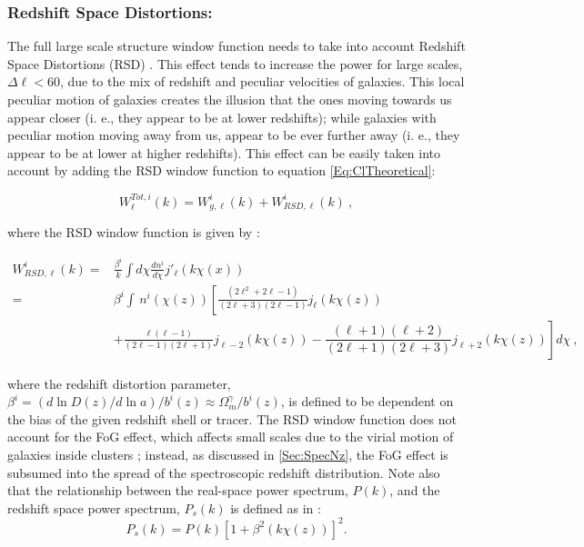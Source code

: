 \subsubsection{Redshift Space Distortions:}\label{Sec:RSD}
The full large scale structure window function needs to take into account Redshift Space Distortions (RSD) \citep{1987Kaiser-RSD,Blake2007,Padm2007,Thomas2011}. This effect tends to increase the power for large scales, $\Delta \ell < 60$, due to the mix of redshift and peculiar velocities of galaxies. This local peculiar motion of galaxies creates the illusion that the ones moving towards us appear closer (i. e., they appear to be at lower redshifts); while galaxies with peculiar motion moving away from us, appear to be ever further away (i. e., they appear to be at lower at higher redshifts). This effect can be easily taken into account by adding the RSD window function  \citep{ScharfLahav1992, FisherLahav1994, Kirk2015, 2016McLeod} to equation \eqref{Eq:ClTheoretical}:

\begin{equation}\label{Eq:Window_counts}
W^{Tot,i}_{\ell}(k) = W^i_{g, \ell}(k) + W^i_{RSD,\ell}(k) \ , 
\end{equation}

where the RSD window function is given by \citep{ScharfLahav1992, Padm2007,Ho2012,Kirk2015}:

\begin{equation}
\begin{split}
W^i_{RSD,\ell}(k)  = & \frac{\beta^i}{k} \int d\chi \frac{dn^i}{d\chi} j'_{\ell}(k\chi (x)) \\
 = & \beta^i \int \, n^i(\chi(z))\left[ \frac{(2\ell^2 + 2\ell -1)}{(2\ell + 3)(2\ell -1)}j_{\ell}(k\chi(z)) \right. \\
& \left. + \frac{\ell(\ell-1)}{(2\ell-1)(2\ell+1)}j_{\ell-2}(k\chi(z)) -  \dfrac{(\ell+1)(\ell+2)}{(2\ell+1)(2\ell+3)}j_{\ell+2}(k\chi(z)) \right] d\chi \ ,
\end{split}
\end{equation}

where the redshift distortion parameter, $\beta^i = (d \ln D(z)/d\ln a)/b^{i}(z) \approx \Omega_m^{\gamma}/b^i(z)$, is defined to be dependent on the bias of the given redshift shell or tracer. The RSD window function does not account for the FoG effect, which affects small scales due to the virial motion of galaxies inside clusters \citep{Kang2002}; instead, as discussed in \ref{Sec:SpecNz}, the FoG effect is subsumed into the spread of the spectroscopic redshift distribution.  Note also that the relationship between the real-space power spectrum, $P(k)$, and the redshift space power spectrum, $P_{s}(k)$ is defined as in \cite{1987Kaiser-RSD}:
\begin{equation}
    P_s(k) = P(k)[1+\beta^2(k\chi(z))]^2 .
\end{equation}

